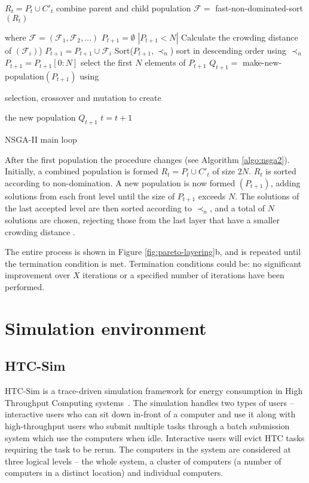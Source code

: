 \documentclass[10pt, conference, compsocconf]{IEEEtran}
\begin{document}
\begin{algorithm}[b]
\begin{algorithmic}[1]
\State $R_t=P_t \cup C'_t$ combine parent and child population
\State $\mathcal{F} = $ fast-non-dominated-sort $(R_t)$ 

where $\mathcal{F}=(\mathcal{F}_1, \mathcal{F}_2,\ldots)$
\State $P_{t+1}=\emptyset$
\While $\left|P_{t+1}<N\right|$
\State Calculate the crowding distance of $(\mathcal{F}_i)$)
\State $P_{t+1}=P_{t+1}\cup \mathcal{F}_i$
\EndWhile
\State Sort($P_{t+1}, \prec_n$) sort in descending order using $\prec_n$
\State $P_{t+1} = P_{t+1}[0:N]$ select the first $N$ elements of $P_{t+1}$
\State $Q_{t+1} = $ make-new-population$(P_{t+1})$ using 

selection, crossover and mutation to create 

the new population $Q_{t+1}$
\State $t=t+1$
\caption{NSGA-II main loop \cite{Valkanas2014}}
\label{algo:nsga2}
\end{algorithmic}
\end{algorithm}
After the first population the procedure changes (see Algorithm \ref{algo:nsga2}). Initially, a combined population is formed $R_{t}=P_{t} \cup C'_{t}$ of size $2N$. $R_{t}$ is sorted according to non-domination. A new population is now formed $(P_{t+1})$, adding solutions from each front level until the size of $P_{t+1}$ exceeds $N$. The solutions of the last accepted level are then sorted according to $\prec_n$, and a total of $N$ solutions are chosen, rejecting those from the last layer that have a smaller crowding distance \cite{Valkanas2014}.

The entire process is shown in Figure \ref{fig:pareto-layering}b, and is repeated until the termination condition is met. Termination conditions could be: no significant improvement over $X$ iterations or a specified number of iterations have been performed.

%  

\section{Simulation environment}
\label{environment}
\subsection{HTC-Sim}
HTC-Sim is a trace-driven simulation framework for energy consumption in High Throughput Computing systems~\cite{htc-sim-short}. The simulation handles two types of users -- interactive users who can sit down in-front of a computer and use it along with high-throughput users who submit multiple tasks through a batch submission system which use the computers when idle. Interactive users will evict HTC tasks requiring the task to be rerun. The computers in the system are considered at three logical levels -- the whole system, a cluster of computers (a number of computers in a distinct location) and individual computers.
\end{document}
